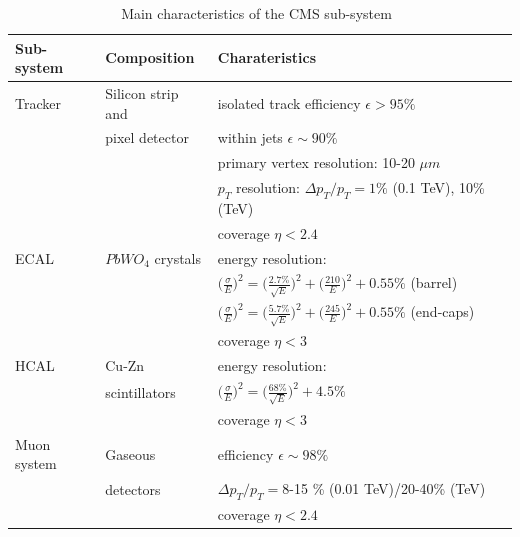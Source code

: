 {{{\begin{table}
\centering
\begin{tabular}[!htbp]{l l l}
\hline
{\bf Sub-system} & {\bf Composition} & {\bf Charateristics} \\
\hline
Tracker  & Silicon strip and  & isolated track efficiency $\epsilon > 95\%$ \\
	& pixel detector	& within jets $\epsilon \sim 90\%$ \\
	& 	& primary vertex resolution: 10-20 $\mu m$ \\
	& 	& $p_T$ resolution: $\Delta p_T/p_T = 1\%$ (0.1 TeV), 10\% (TeV)\\
	& 	& coverage $\eta<2.4$ \\
\hline
ECAL 	& 	$PbWO_4$ crystals 	& energy resolution:\\
		& 	& $\big(\frac{\sigma}{E}\big)^2 = \big(\frac{2.7\%}{\sqrt{E}}\big)^2 + \big(\frac{210}{E}\big)^2 + 0.55\% $  (barrel)\\
		& 	& $\big(\frac{\sigma}{E}\big)^2 = \big(\frac{5.7\%}{\sqrt{E}}\big)^2 + \big(\frac{245}{E}\big)^2 + 0.55\% $  (end-caps)\\
		& 	& coverage $\eta < 3$ \\
\hline
HCAL 	& 	Cu-Zn 	& energy resolution:\\
		& 	scintillators & $\big(\frac{\sigma}{E}\big)^2 = \big(\frac{68\%}{\sqrt{E}}\big)^2 + 4.5\%$ \\
		& 	& coverage $\eta < 3$ \\
\hline
Muon system & Gaseous & efficiency $\epsilon \sim 98\%$ \\
			& detectors & $\Delta p_T/p_T =$8-15 \% (0.01 TeV)/20-40\% (TeV)\\
		& 	& coverage $\eta < 2.4$ \\
\hline
\end{tabular}
\caption{Main characteristics of the CMS sub-system~\cite{JeremieThesis}}
\label{table:CMSMainChar}
\end{table}


}}}
